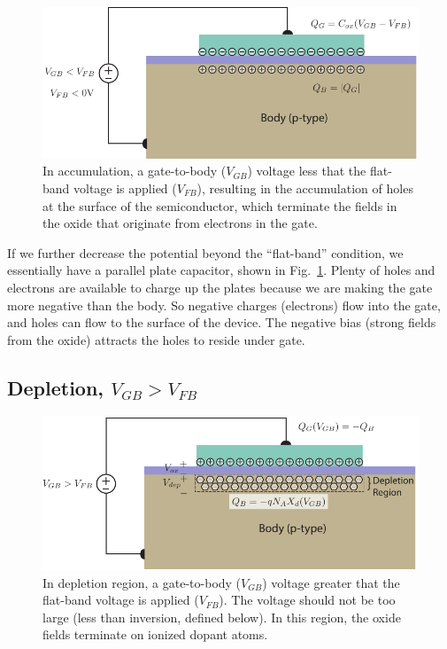 \begin{figure}[tbh]
\begin{center}
\includegraphics[width=.75\columnwidth]{mos_cap_acc}
\end{center}
\caption{In accumulation, a gate-to-body ($V_{GB}$) voltage less that the flat-band voltage is applied ($V_{FB}$), resulting in the accumulation of holes at the surface of the semiconductor, which terminate the fields in the oxide that originate from electrons in the gate.} \label{fig:mos_accum}
\end{figure}

If we further decrease the potential beyond the “flat-band” condition, we essentially have a parallel plate capacitor, shown in Fig.~\ref{fig:mos_accum}.  Plenty of holes and electrons are available to charge up the plates because we are making the gate more negative than the body.  So negative charges (electrons) flow into the gate, and holes can flow to the surface of the device.  The negative bias (strong fields from the oxide) attracts the holes to reside under gate.
 

\subsection{Depletion, $V_{GB} > V_{FB}$}

\begin{figure}[tbh]
\begin{center}
\includegraphics[width=.75\columnwidth]{mos_cap_depletion}
\end{center}
\caption{In depletion region, a gate-to-body ($V_{GB}$) voltage greater that the flat-band voltage is applied ($V_{FB}$).  The voltage should not be too large (less than inversion, defined below).  In this region, the oxide fields terminate on ionized dopant atoms.  } \label{fig:mos_dep}
\end{figure}

